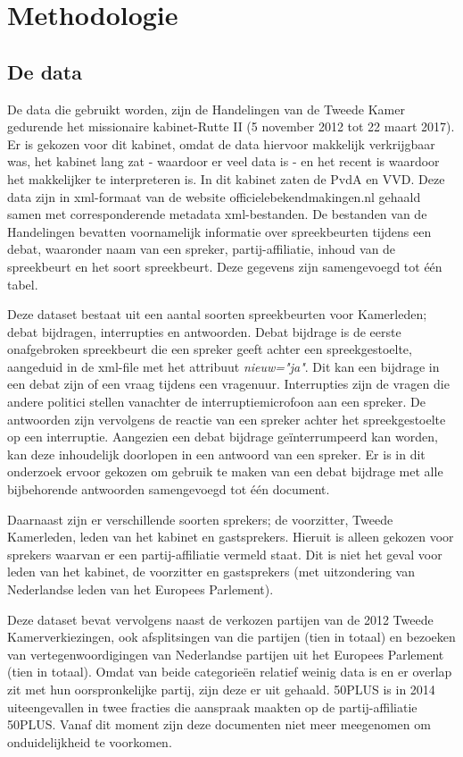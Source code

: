 \section{Methodologie}
\label{sec:meth}


\subsection{De data}
\label{data}
De data die gebruikt worden, zijn de Handelingen van de Tweede Kamer gedurende het missionaire kabinet-Rutte II (5 november 2012 tot 22 maart 2017). Er is gekozen voor dit kabinet, omdat de data hiervoor makkelijk verkrijgbaar was, het kabinet lang zat - waardoor er veel data is - en het recent is waardoor het makkelijker te interpreteren is. In dit kabinet zaten de PvdA en VVD. Deze data zijn in xml-formaat van de website officielebekendmakingen.nl gehaald samen met corresponderende metadata xml-bestanden. De bestanden van de Handelingen bevatten voornamelijk informatie over spreekbeurten tijdens een debat, waaronder naam van een spreker, partij-affiliatie, inhoud van de spreekbeurt en het soort spreekbeurt. Deze gegevens zijn samengevoegd tot één tabel.\par
Deze dataset bestaat uit een aantal soorten spreekbeurten voor Kamerleden; debat bijdragen, interrupties en antwoorden. Debat bijdrage is de eerste onafgebroken spreekbeurt die een spreker geeft achter een spreekgestoelte, aangeduid in de xml-file met het attribuut \textit{nieuw="ja"}. Dit kan een bijdrage in een debat zijn of een vraag tijdens een vragenuur. Interrupties zijn de vragen die andere politici stellen vanachter de interruptiemicrofoon aan een spreker. De antwoorden zijn vervolgens de reactie van een spreker achter het spreekgestoelte op een interruptie. Aangezien een debat bijdrage geïnterrumpeerd kan worden, kan deze inhoudelijk doorlopen in een antwoord van een spreker. Er is in dit onderzoek ervoor gekozen om gebruik te maken van een debat bijdrage met alle bijbehorende antwoorden samengevoegd tot één document.\par
Daarnaast zijn er verschillende soorten sprekers; de voorzitter, Tweede Kamerleden, leden van het kabinet en gastsprekers. Hieruit is alleen gekozen voor sprekers waarvan er een partij-affiliatie vermeld staat. Dit is niet het geval voor leden van het kabinet, de voorzitter en gastsprekers (met uitzondering van Nederlandse leden van het Europees Parlement).\par
Deze dataset bevat vervolgens naast de verkozen partijen van de 2012 Tweede Kamerverkiezingen, ook afsplitsingen van die partijen (tien in totaal) en bezoeken van vertegenwoordigingen van Nederlandse partijen uit het Europees Parlement (tien in totaal). Omdat van beide categorieën relatief weinig data is en er overlap zit met hun oorspronkelijke partij, zijn deze er uit gehaald. 50PLUS is in 2014 \cite{50PLUSNRC} uiteengevallen in twee fracties die aanspraak maakten op de partij-affiliatie 50PLUS. Vanaf dit moment zijn deze documenten niet meer meegenomen om onduidelijkheid te voorkomen.\par

